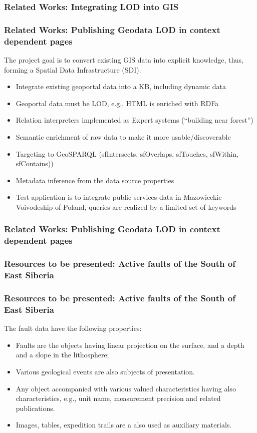 \documentclass[10pt]{beamer}
\begin{document}
\begin{frame}
  \frametitle{Related Works: Integrating LOD into GIS}
\end{frame}


\begin{frame}
  \frametitle{Related Works: Publishing Geodata LOD in context dependent pages}
  The project \cite{iwaniak17} goal is to convert existing GIS data into explicit knowledge, thus, forming a Spatial Data Infrastructure (SDI).
  \begin{itemize}
  \item Integrate existing geoportal data into a KB, including dynamic data
  \item Geoportal data must be LOD, e.g., HTML is enriched with RDFa
  \item Relation interpreters implemented as Expert systems (``building near forest'')
  \item Semantic enrichment of raw data to make it more usable/discoverable
  \item Targeting to GeoSPARQL (sfIntersects, sfOverlaps, sfTouches, sfWithin, sfContains))
  \item Metadata inference from the data source properties
  \item Test application is to integrate public services data in Mazowieckie Voivodeship of Poland, queries are realized by a limited set of keywords
  \end{itemize}
\end{frame}

\begin{frame}
  \frametitle{Related Works: Publishing Geodata LOD in context dependent pages}
\end{frame}


\begin{frame}
  \frametitle{Resources to be presented: Active faults of the South of
    East Siberia}
\end{frame}

\begin{frame}
  \frametitle{Resources to be presented: Active faults of the South of
    East Siberia}
  The fault data have the following properties:
  \begin{itemize}
  \item Faults are the objects having linear projection on the surface, and a depth and a slope in the lithosphere;
  \item Various geological events are also subjects of presentation.
  \item Any object accompanied with various valued characteristics having also characteristics, e.g., unit name, measurement precision and related publications.
  \item Images, tables, expedition trails are a also used as auxiliary materials.
  \end{itemize}
\end{frame}
\end{document}
